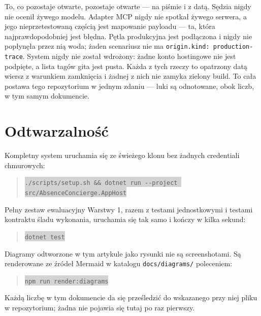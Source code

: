 \documentclass[11pt,a4paper]{article}
\newcommand{\repopath}[1]{\colorbox{lightgray}{\texttt{#1}}}
\begin{document}
To, co pozostaje otwarte, pozostaje otwarte --- na piśmie i z datą. Sędzia nigdy
nie ocenił żywego modelu. Adapter MCP nigdy nie spotkał żywego serwera, a jego
nieprzetestowaną częścią jest mapowanie payloadu --- ta, która najprawdopodobniej
jest błędna. Pętla produkcyjna jest podłączona i nigdy nie popłynęła przez nią
woda; żaden scenariusz nie ma \texttt{origin.kind: production-trace}. System
nigdy nie został wdrożony: żadne konto hostingowe nie jest podpięte, a lista
tagów gita jest pusta. Każda z tych rzeczy to opatrzony datą wiersz z warunkiem
zamknięcia i żadnej z nich nie zamyka zielony build. To cała postawa tego
repozytorium w jednym zdaniu --- luki są odnotowane, obok liczb, w tym samym
dokumencie.

\section*{Odtwarzalność}

Kompletny system uruchamia się ze świeżego klonu bez żadnych credentiali
chmurowych:

\begin{quote}
\repopath{./scripts/setup.sh \&\& dotnet run -{}-project src/AbsenceConcierge.AppHost}
\end{quote}

\noindent Pełny zestaw ewaluacyjny Warstwy 1, razem z testami jednostkowymi i
testami kontraktu śladu wykonania, uruchamia się tak samo i kończy w kilka
sekund:

\begin{quote}
\repopath{dotnet test}
\end{quote}

\noindent Diagramy odtworzone w tym artykule jako rysunki nie są screenshotami.
Są renderowane ze źródeł Mermaid w katalogu \texttt{docs/diagrams/} poleceniem:

\begin{quote}
\repopath{npm run render:diagrams}
\end{quote}

\noindent Każdą liczbę w tym dokumencie da się prześledzić do wskazanego przy
niej pliku w repozytorium; żadna nie pojawia się tutaj po raz pierwszy.
\end{document}
